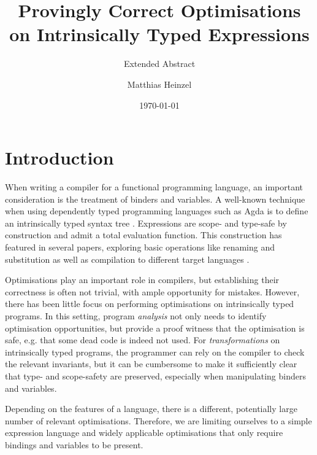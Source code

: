 \documentclass[sigplan,nonacm,screen,review,timestamp]{acmart}
\title{Provingly Correct Optimisations on Intrinsically Typed Expressions}
\subtitle{Extended Abstract}
\author{Matthias Heinzel}
\affiliation{%
  \institution{Utrecht University}
  \city{Utrecht}
  \country{Netherlands}}
\date{\today}
\newcommand{\Draft}[1]{{\color{gray} - #1}}
\begin{document}
\maketitle

\section{Introduction}

When writing a compiler for a functional programming language,
an important consideration is the treatment of binders and variables.
A well-known technique when using dependently typed programming languages such as Agda
\cite{norell2007agda}
is to define an intrinsically typed syntax tree \cite{augustsson1999intrinsic}.
Expressions are scope- and type-safe by construction and admit a total evaluation function.
This construction has featured in several papers, exploring
basic operations like renaming and substitution
\cite{allais2018universe}
as well as compilation to different target languages
\cite[supplemental material]{pickard2021calculating}.

Optimisations play an important role in compilers, but
establishing their correctness is often not trivial,
with ample opportunity for mistakes.
However, there has been little focus on performing optimisations on intrinsically typed programs.
%
In this setting, program \emph{analysis} not only needs to identify optimisation opportunities,
but provide a proof witness that the optimisation is safe,
e.g. that some dead code is indeed not used.
For \emph{transformations} on intrinsically typed programs,
the programmer can rely on the compiler to check the relevant invariants,
but it can be cumbersome to make it sufficiently clear that type- and scope-safety are preserved,
especially when manipulating binders and variables.

Depending on the features of a language, there is a different,
potentially large number of relevant optimisations.
Therefore, we are limiting ourselves to a simple expression language
and widely applicable optimisations that only require bindings and variables to be present.
\end{document}
